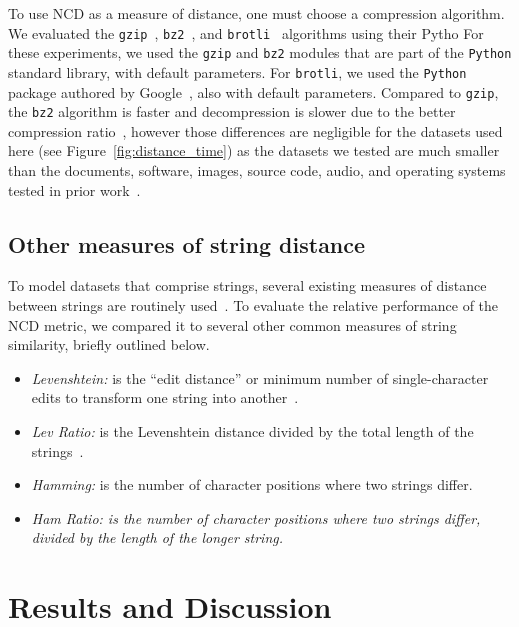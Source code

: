 \documentclass[preprint,12pt]{article}
\begin{document}
To use NCD as a measure of distance, one must choose a compression algorithm.
We evaluated the \texttt{gzip}~\cite{gzip}, \texttt{bz2}~\cite{bz2}, and \texttt{brotli}~\cite{brotli_package} algorithms using their Pytho
For these experiments, we used the \texttt{gzip} and \texttt{bz2} modules that are part of the \texttt{Python} standard library, with default parameters.
For \texttt{brotli}, we used the \texttt{Python} package authored by Google~\cite{brotli_package}, also with default parameters.
Compared to \texttt{gzip}, the \texttt{bz2} algorithm is faster and decompression is slower due to the better compression ratio~\cite{bz2_comparison}, however those differences are negligible for the datasets used here (see Figure~\ref{fig:distance_time}) as the datasets we tested are much smaller than the documents, software, images, source code, audio, and operating systems tested in prior work~\cite{bz2_comparison}.

\subsection{Other measures of string distance}
\label{string_metrics}
To model datasets that comprise strings, several existing measures of distance between strings are routinely used~\cite{levenshtein}.
To evaluate the relative performance of the NCD metric, we compared it to several other common measures of string similarity, briefly outlined below.
\begin{itemize}
    \item \textit{Levenshtein:} is the ``edit distance'' or minimum number of single-character edits to transform one string into another~\cite{navarro2001guided}.
    \item \textit{Lev Ratio:} is the Levenshtein distance divided by the total length of the strings~\cite{levenshtein}.
    \item \textit{Hamming:} is the number of character positions where two strings differ. 
    \item \textit{Ham Ratio: is the number of character positions where two strings differ, divided by the length of the longer string.}
\end{itemize}





\section{Results and Discussion}
\label{results}
\end{document}

